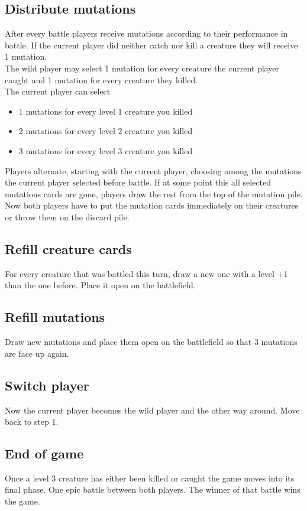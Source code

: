 \documentclass[a4paper,12pt]{article}
\begin{document}
\subsection{Distribute mutations}
After every battle players receive mutations according to their performance in battle.
If the current player did neither catch nor kill a creature they will receive 1 mutation.\\
The wild player may select 1 mutation for every creature the current player caught and 1 mutation for every creature they killed. \\
The current player can select
\begin{itemize}
	\item 1 mutations for every level 1 creature you killed
	\item 2 mutations for every level 2 creature you killed
	\item 3 mutations for every level 3 creature you killed
\end{itemize}
Players alternate, starting with the current player, choosing among the mutations the current player selected before battle. 
If at some point this all selected mutations cards are gone, players draw the rest from the top of the mutation pile.\\
Now both players have to put the mutation cards immediately on their creatures or throw them on the discard pile.
\subsection{Refill creature cards}
For every creature that was battled this turn, draw a new one with a level +1 than the one before. Place it open on the battlefield.
\subsection{Refill mutations}
Draw new mutations and place them open on the battlefield so that 3 mutations are face up again.
\subsection{Switch player}
Now the current player becomes the wild player and the other way around.
Move back to step 1.
\subsection{End of game}
Once a level 3 creature has either been killed or caught the game moves into its final phase. One epic battle between both players.
The winner of that battle wins the game.
\end{document}
